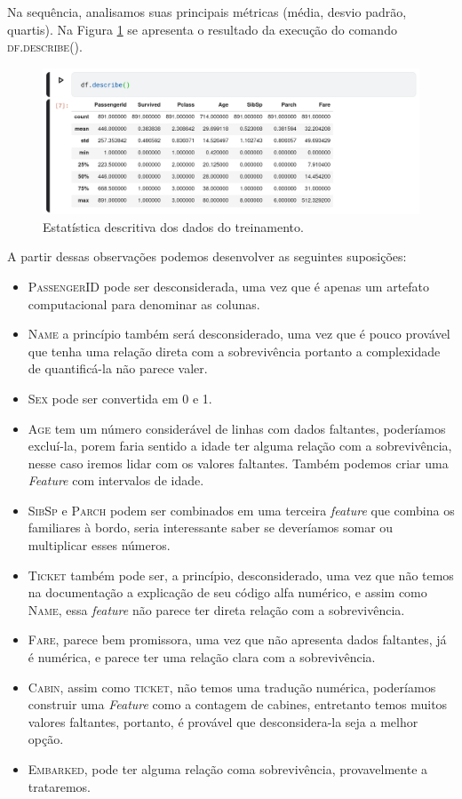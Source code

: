 Na sequência, analisamos suas principais métricas (média, desvio padrão, quartis). Na Figura \ref{df.describe} se apresenta o resultado da execução do comando \textsc{df.describe()}.
\begin{figure}[H]
\centering
\includegraphics[width=\textwidth]{Figures/df.describe().png}
\caption{\label{df.describe}Estatística descritiva dos dados do treinamento.}
\end{figure}

A partir dessas observações podemos desenvolver as seguintes suposições:
\begin{itemize}
\item \textsc{PassengerID} pode ser desconsiderada, uma vez que é apenas um artefato computacional para denominar as colunas.
\item \textsc{Name} a princípio também será desconsiderado, uma vez que é pouco provável que tenha uma relação direta com a sobrevivência portanto a complexidade de quantificá-la não parece valer. 
\item \textsc{Sex} pode ser convertida em 0 e 1. 
\item \textsc{Age} tem um número considerável de linhas com dados faltantes, poderíamos excluí-la, porem faria sentido a idade ter alguma relação com a sobrevivência, nesse caso iremos lidar com os valores faltantes. Também podemos criar uma \emph{Feature} com intervalos de idade. 
\item \textsc{SibSp} e \textsc{Parch} podem ser combinados em uma terceira \emph{feature} que combina os familiares à bordo, seria interessante saber se deveríamos somar ou multiplicar esses números. 
\item \textsc{Ticket} também pode ser, a princípio, desconsiderado, uma vez que não temos na documentação a explicação de seu código alfa numérico, e assim como \textsc{Name}, essa \emph{feature} não parece ter direta relação com a sobrevivência. 
\item  \textsc{Fare}, parece bem promissora, uma vez que não apresenta dados faltantes, já é numérica, e parece ter uma relação clara com a sobrevivência.  
\item \textsc{Cabin}, assim como \textsc{ticket}, não temos uma tradução numérica, poderíamos construir uma \emph{Feature} como a contagem de cabines, entretanto temos muitos valores faltantes, portanto, é provável que desconsidera-la seja a melhor opção. 
\item \textsc{Embarked}, pode ter alguma relação coma sobrevivência, provavelmente a trataremos. 
\end{itemize}

